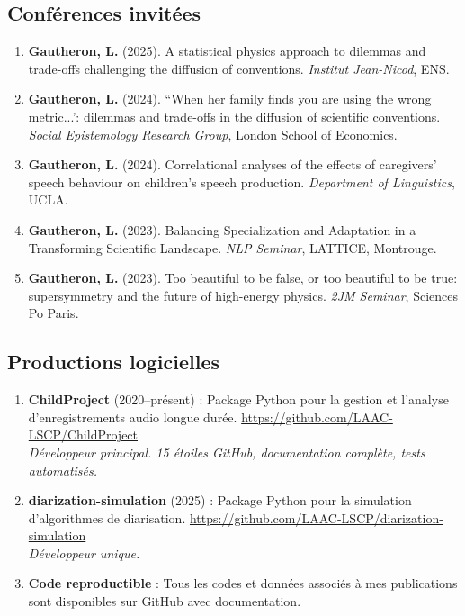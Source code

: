 \documentclass[11pt,a4paper]{article}
\begin{document}
\subsection{Conférences invitées}

\begin{enumerate}
    \item \textbf{Gautheron, L.} (2025). A statistical physics approach to dilemmas and trade-offs challenging the diffusion of conventions. \textit{Institut Jean-Nicod}, ENS.
    
    \item \textbf{Gautheron, L.} (2024). ``When her family finds you are using the wrong metric...': dilemmas and trade-offs in the diffusion of scientific conventions. \textit{Social Epistemology Research Group}, London School of Economics.
    
    \item \textbf{Gautheron, L.} (2024). Correlational analyses of the effects of caregivers' speech behaviour on children's speech production. \textit{Department of Linguistics}, UCLA.
    
    \item \textbf{Gautheron, L.} (2023). Balancing Specialization and Adaptation in a Transforming Scientific Landscape. \textit{NLP Seminar}, LATTICE, Montrouge.
    
    \item \textbf{Gautheron, L.} (2023). Too beautiful to be false, or too beautiful to be true: supersymmetry and the future of high-energy physics. \textit{2JM Seminar}, Sciences Po Paris.
\end{enumerate}

\subsection{Productions logicielles}

\begin{enumerate}
    \item \textbf{ChildProject} (2020--présent) : Package Python pour la gestion et l'analyse d'enregistrements audio longue durée. \url{https://github.com/LAAC-LSCP/ChildProject}\\
    \textit{Développeur principal. 15 étoiles GitHub, documentation complète, tests automatisés.}
    
    \item \textbf{diarization-simulation} (2025) : Package Python pour la simulation d'algorithmes de diarisation. \url{https://github.com/LAAC-LSCP/diarization-simulation}\\
    \textit{Développeur unique.}
    
    \item \textbf{Code reproductible} : Tous les codes et données associés à mes publications sont disponibles sur GitHub avec documentation.
\end{enumerate}
\end{document}
